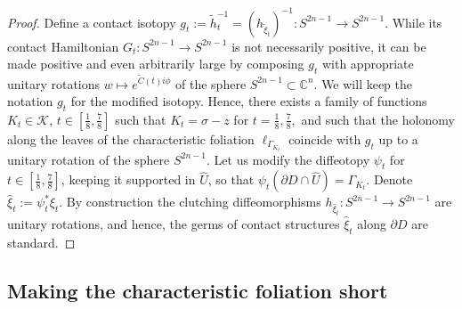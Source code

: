 \documentclass[12pt]{amsart}
\theoremstyle{plain}
\theoremstyle{definition}
\theoremstyle{remark}
\newcommand{\C}{\mathbb{C}}
\newcommand{\cK}{\mathcal{K}}
\newcommand{\p}{\partial}
\newcommand{\wt}{\widetilde}
\newcommand{\wh}{\widehat}
\begin{document}
\begin{proof}
    Define a  contact isotopy $g_t:=\wt h_t^{-1}=(h_{\wt\xi_t})^{-1}:S^{2n-1}\to S^{2n-1}$. While its contact Hamiltonian $G_t:S^{2n-1}\to S^{2n-1}$   is not necessarily positive, it can be made positive and  even arbitrarily large by composing $g_t$ with appropriate unitary  rotations $w\mapsto e^{\wt C(t)i\phi}$ of the sphere
   $S^{2n-1}\subset \C^n$. We  will keep the notation   $g_t$  for the modified isotopy.  Hence, there exists a family  of functions $K_t\in \cK$, $t\in[\frac18,\frac78]$  such that  $K_t=\sigma-z$ for $t=\frac18,\frac78,$  and  such that the holonomy along the leaves of the characteristic foliation $\ell_{\Gamma_{K_t}}$  coincide with $g_t$ up to a unitary rotation of the sphere $S^{2n-1}$. Let us modify the diffeotopy $\psi_t$ for $t\in[\frac18,\frac78]$, keeping it supported in $\wh U$, so that $\psi_t(\p D\cap\wh U)=\Gamma_{K_t}$.
  Denote   $\wh\xi_t:=\psi_t^*\xi_t$. By construction the clutching diffeomorphisms $h_{\wh\xi_t}:S^{2n-1}\to S^{2n-1}$ are unitary rotations, and hence, the germs of contact structures $\wh\xi_t$ along $\p D$ are standard.
  
 \end{proof}
 
 
  \subsection{Making the characteristic foliation short} \label{sec:making-short}
 
\end{document}

